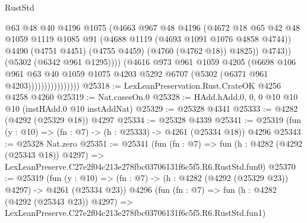 \begin{lexlean}{RustStd}
\begin{coremodule}
                                    @63
                                    @48
                                    @40
                                    @4196
                                    @1075
                                    (@4663
                                      @967
                                      @48
                                      @4196
                                      (@4672
                                        @18
                                        @65
                                        @42
                                        @48
                                        @1059
                                        @1119
                                        @1085
                                        @91
                                        (@4688 @1119 (@4693 @1091 @1076 @4858 @4744))
                                        @4490
                                        (@4751 @4451)
                                        (@4755 @4459)
                                        (@4760 (@4762 @18))
                                        @4825))
                                    @4743))
                                (@5302 (@6342 @961 @1295))))
                            (@4616
                              @973
                              @961
                              @1059
                              @4205
                              (@6698
                                @106
                                @961
                                @63
                                @40
                                @1059
                                @1075
                                @4203
                                @5292
                                @6707
                                (@5302 (@6371 @961 @4203))))))))))))))))
@25318 := LexLeanPreservation.Rust.CrateOK @4256 @4258 @4260
@25319 := Nat.casesOn.{0}
@25328 := HAdd.hAdd.{0, 0, 0} @10 @10 @10 (instHAdd.{0} @10 instAddNat)
@25329 := @25328 @4341
@25333 := @4282 (@4292 (@25329 @18)) @4297
@25334 := @25328 @4339
@25341 := @25319 (fun (y : @10) => (fn : @7) -> (h : @25333) -> @4261 (@25334 @18)) @4296
@25343 := @25328 Nat.zero
@25351 := @25341
    (fun (fn : @7) =>
    fun (h : @4282 (@4292 (@25343 @18)) @4297) =>
    LexLeanPreserve.C27e2f04c213e278fbc03706131f6c5f5.R6.RustStd.fun0)
@25370 := @25319
    (fun (y : @10) => (fn : @7) -> (h : @4282 (@4292 (@25329 @23)) @4297) -> @4261 (@25334 @23))
    @4296
    (fun (fn : @7) =>
    fun (h : @4282 (@4292 (@25343 @23)) @4297) =>
    LexLeanPreserve.C27e2f04c213e278fbc03706131f6c5f5.R6.RustStd.fun1)

\end{coremodule}
\end{lexlean}
